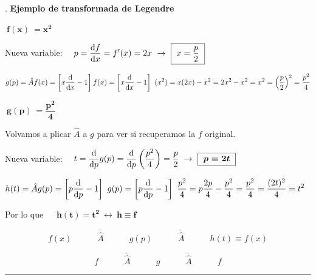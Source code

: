 \begin{example}

.	\vspace{2mm} \textbf{Ejemplo de transformada de Legendre	}

\vspace{2mm} $\boxed{ \ \boldsymbol{f(x) \ = x^2} \ }$

\vspace{2mm} Nueva variable: $\quad p=\displaystyle \dv{f}{x} = f'(x)=2x \ \to \ \boxed{\ x=\dfrac p 2 \ }$

\vspace{2mm} $\displaystyle g(p)=\hat A f(x)=\left[x\dv{x}-1\right] f(x) = \left[x\dv{x}-1\right] \ (x^2) = x(2x)-x^2=2x^2-x^2=x^2=\left( \dfrac p 2 \right)^2= \dfrac{p^2}{4}$

\vspace{2mm} $\boxed{ \boldsymbol{ \ g(p)\ = \dfrac{p^2}{4} } \ }$

\vspace{2mm} Volvamos a plicar $\hat A$ a $g$ para ver si recuperamos la $f$ original.

\vspace{2mm} Nueva variable: $\quad t=\displaystyle \dv{p} g(p) = \dv{p} \left( \dfrac{p^2}{4} \right) =\dfrac p 2 \ \to \ \boxed{\ \boldsymbol{p=2t} \ }$

\vspace{2mm} $h(t)=\hat A g(p) = \displaystyle \left[p\dv{p}-1\right] \ g(p)=\left[p\dv{p}-1\right] \ \dfrac{p^2}{4} = p \dfrac{2p}{4}-\dfrac{p^2}{4}=\dfrac{p^2}{4}=\dfrac{(2t)^2}{4}=t^2$

\vspace{2mm} Por lo que $\quad \boxed{\ \boldsymbol{ h(t)=t^2 \ \leftrightarrow \ h \equiv f } \ }$

$$f(x) \qquad \underrightarrow{\quad \hat{A} \quad} \qquad g(p) \qquad  
\underrightarrow{\quad \hat{A} \quad} \qquad h(t) \equiv f(x)$$

\vspace{2mm} 
\end{example}

\begin{theorem}

 $$f\qquad \underrightarrow{\quad \hat{A} \quad} \qquad g \qquad  
\underrightarrow{\quad \hat{A} \quad}  \qquad f	$$

\vspace{0.1mm}
\end{theorem}
\textcolor{brown}{\rule{200pt}{0.3pt}}

